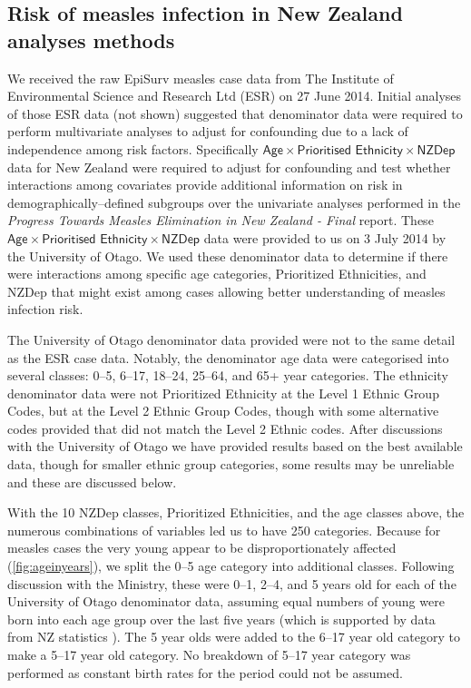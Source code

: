 \documentclass{article}
\begin{document}
\subsection{Risk of measles infection in New Zealand analyses methods}
\label{sub:regression}
We received the raw EpiSurv measles case data from The Institute of Environmental Science and Research Ltd (ESR) on 27 June 2014. Initial analyses of those ESR data (not shown) suggested that denominator data were required to perform multivariate analyses to adjust for confounding due to a lack of independence among risk factors. Specifically $\textsf{Age} \times \textsf{Prioritised Ethnicity} \times \textsf{NZDep}$ data for New Zealand were required to adjust for confounding and test whether interactions among covariates provide additional information on risk in demographically--defined subgroups over the univariate analyses performed in the \emph{Progress Towards Measles Elimination in New Zealand - Final} report. These $\textsf{Age} \times \textsf{Prioritised Ethnicity} \times \textsf{NZDep}$ data were provided to us on 3 July 2014 by the University of Otago. We used these denominator data to determine if there were interactions among specific age categories, Prioritized Ethnicities, and NZDep that might exist among cases allowing better understanding of measles infection risk.

The University of Otago denominator data provided were not to the same detail as the ESR case data. Notably, the denominator age data were categorised into several classes: 0--5, 6--17, 18--24, 25--64, and 65+ year categories. The ethnicity denominator data were not Prioritized Ethnicity at the Level 1 Ethnic Group Codes, but at the Level 2 Ethnic Group Codes, though with some alternative codes provided that did not match the Level 2 Ethnic codes. After discussions with the University of Otago we have provided results based on the best available data, though for smaller ethnic group categories, some results may be unreliable and these are discussed below.

With the 10 NZDep classes, Prioritized Ethnicities, and the age classes above, the numerous combinations of variables led us to have 250 categories. Because for measles cases the very young appear to be disproportionately affected (\autoref{fig:ageinyears}), we split the 0--5 age category into additional classes. Following discussion with the Ministry, these were 0--1, 2--4, and 5 years old for each of the University of Otago denominator data, assuming equal numbers of young were born into each age group over the last five years (which is supported by data from NZ statistics \citep{stats14}). The 5 year olds were added to the 6--17 year old category to make a 5--17 year old category. No breakdown of 5--17 year category was performed as constant birth rates for the period could not be assumed.
\end{document}
